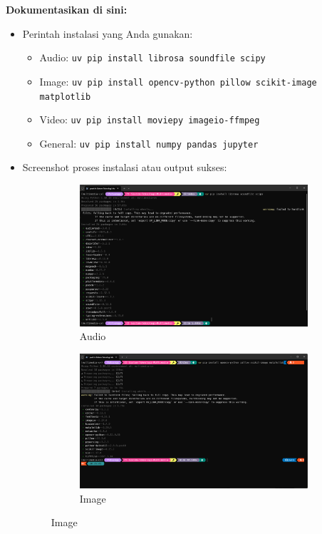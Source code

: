 \documentclass[11pt,a4paper]{article}
\begin{document}
\textbf{Dokumentasikan di sini:}
\begin{itemize}[leftmargin=*]
  \item Perintah instalasi yang Anda gunakan:
    \begin{itemize}
      \item Audio: \verb|uv pip install librosa soundfile scipy|
      \item Image: \verb|uv pip install opencv-python pillow scikit-image matplotlib|
      \item Video: \verb|uv pip install moviepy imageio-ffmpeg|
      \item General: \verb|uv pip install numpy pandas jupyter|
    \end{itemize}

  \item Screenshot proses instalasi atau output sukses:
    \begin{figure}[h]
      \centering

      \begin{subfigure}[b]{0.48\textwidth}
        \includegraphics[width=\linewidth]{Figure/img2.png}
        \caption{Audio}
      \end{subfigure}\hfill
      \begin{subfigure}[b]{0.48\textwidth}
        \includegraphics[width=\linewidth]{Figure/img3.png}
        \caption{Image}
      \end{subfigure}


\end{figure}
\end{itemize}
\end{document}
